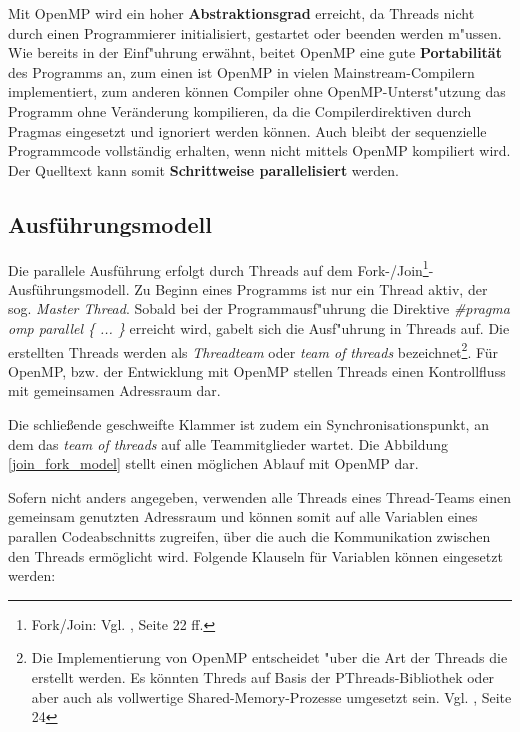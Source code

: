 \documentclass[11pt]{scrartcl}
\begin{document}
Mit OpenMP wird ein hoher \textbf{Abstraktionsgrad} erreicht, da Threads nicht durch einen Programmierer initialisiert, gestartet oder beenden werden m"ussen. Wie bereits in der Einf"uhrung erwähnt, beitet OpenMP eine gute \textbf{Portabilität} des Programms an, zum einen ist OpenMP in vielen Mainstream-Compilern implementiert, zum anderen können Compiler ohne OpenMP-Unterst"utzung das Programm ohne Veränderung kompilieren, da die Compilerdirektiven durch Pragmas eingesetzt und ignoriert werden können. Auch bleibt der sequenzielle Programmcode vollständig erhalten, wenn nicht mittels OpenMP kompiliert wird. Der Quelltext kann somit \textbf{Schrittweise parallelisiert} werden. 

\subsection{Ausführungsmodell}

Die parallele Ausführung erfolgt durch Threads auf dem Fork-/Join\footnote{Fork/Join: Vgl. \cite{openmp08}, Seite 22 ff.}-Ausführungsmodell. Zu Beginn eines Programms ist nur ein Thread aktiv, der sog. \textit{Master Thread}. Sobald bei der Programmausf"uhrung die Direktive \textit{\#pragma omp parallel \{ ... \} } erreicht wird, gabelt sich die Ausf"uhrung in Threads auf. Die erstellten Threads werden als \textit{Threadteam} oder \textit{team of threads} bezeichnet\footnote{Die Implementierung von OpenMP entscheidet "uber die Art der Threads die erstellt werden. Es könnten Threds auf Basis der PThreads-Bibliothek oder aber auch als vollwertige Shared-Memory-Prozesse umgesetzt sein. Vgl. \cite{openmp08}, Seite 24}. Für OpenMP, bzw. der Entwicklung mit OpenMP stellen Threads einen Kontrollfluss mit gemeinsamen Adressraum dar. 

Die schließende geschweifte Klammer ist zudem ein Synchronisationspunkt, an dem das \emph{team of threads} auf alle Teammitglieder wartet. Die Abbildung \ref{join_fork_model} stellt einen möglichen Ablauf mit OpenMP dar.

Sofern nicht anders angegeben, verwenden alle Threads eines Thread-Teams einen gemeinsam genutzten Adressraum und können somit auf alle Variablen eines parallen Codeabschnitts zugreifen, über die auch die Kommunikation zwischen den Threads ermöglicht wird. Folgende Klauseln für Variablen können eingesetzt werden:
\end{document}
